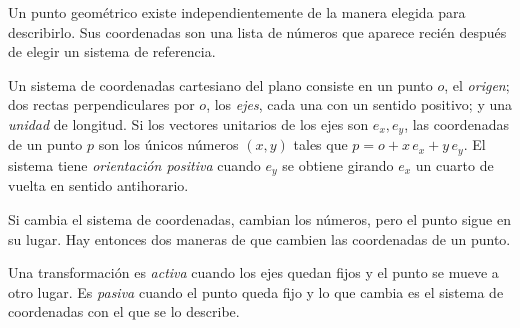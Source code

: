Un punto geométrico existe independientemente de la manera elegida para describirlo. Sus
coordenadas son una lista de números que aparece recién después de elegir un sistema de
referencia.

\begin{definicion}
Un sistema de coordenadas cartesiano del plano consiste en un punto \(o\), el \emph{origen};
dos rectas perpendiculares por \(o\), los \emph{ejes}, cada una con un sentido positivo; y una
\emph{unidad} de longitud. Si los vectores unitarios de los ejes son \(e_x,e_y\), las
coordenadas de un punto \(p\) son los únicos números \((x,y)\) tales que
\(p=o+x\,e_x+y\,e_y\). El sistema tiene \emph{orientación positiva} cuando \(e_y\) se obtiene
girando \(e_x\) un cuarto de vuelta en sentido antihorario.
\end{definicion}

Si cambia el sistema de coordenadas, cambian los números, pero el punto sigue en su lugar.
Hay entonces dos maneras de que cambien las coordenadas de un punto.

\begin{definicion}
Una transformación es \emph{activa} cuando los ejes quedan fijos y el punto se mueve a otro
lugar. Es \emph{pasiva} cuando el punto queda fijo y lo que cambia es el sistema de
coordenadas con el que se lo describe.
\end{definicion}

\begin{center}
\end{center}

